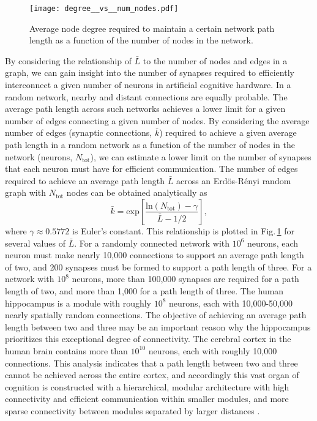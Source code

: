 \documentclass[twocolumn]{article}
\begin{document}
\begin{figure}
    \centering
    \texttt{[image: degree\_\_vs\_\_num\_nodes.pdf]} %
    \caption{Average node degree required to maintain a certain network path length as a function of the number of nodes in the network.}
    \label{fig:degree_vs_num_nodes}
\end{figure}
By considering the relationship of $\bar{L}$ to the number of nodes and edges in a graph, we can gain insight into the number of synapses required to efficiently interconnect a given number of neurons in artificial cognitive hardware. In a random network, nearby and distant connections are equally probable. The average path length across such networks achieves a lower limit for a given number of edges connecting a given number of nodes. By considering the average number of edges (synaptic connections, $\bar{k}$) required to achieve a given average path length in a random network as a function of the number of nodes in the network (neurons, $N_{\mathrm{tot}}$), we can estimate a lower limit on the number of synapses that each neuron must have for efficient communication. The number of edges required to achieve an average path length $\bar{L}$ across an Erd\"{o}s-R\'{e}nyi random graph with $N_{\mathrm{tot}}$ nodes can be obtained analytically as \cite{frfr2004}
\begin{equation}
\label{eq:degree}
\bar{k} = \mathrm{exp} \left[ \frac{\mathrm{ln}(N_{\mathrm{tot}})-\gamma}{\bar{L}-1/2} \right],
\end{equation}
where $\gamma \approx 0.5772$ is Euler's constant. This relationship is plotted in Fig.\,\ref{fig:degree_vs_num_nodes} for several values of $\bar{L}$. For a randomly connected network with $10^6$ neurons, each neuron must make nearly 10,000 connections to support an average path length of two, and 200 synapses must be formed to support a path length of three. For a network with $10^8$ neurons, more than 100,000 synapses are required for a path length of two, and more than 1,000 for a path length of three. The human hippocampus is a module with roughly $10^8$ neurons, each with 10,000-50,000 nearly spatially random connections. The objective of achieving an average path length between two and three may be an important reason why the hippocampus prioritizes this exceptional degree of connectivity. The cerebral cortex in the human brain contains more than $10^{10}$ neurons, each with roughly 10,000 connections. This analysis indicates that a path length between two and three cannot be achieved across the entire cortex, and accordingly this vast organ of cognition is constructed with a hierarchical, modular architecture \cite{si1962} with high connectivity and efficient communication within smaller modules, and more sparse connectivity between modules separated by larger distances \cite{mo1997,mela2010,bosp2015,beba2017}.
\end{document}
